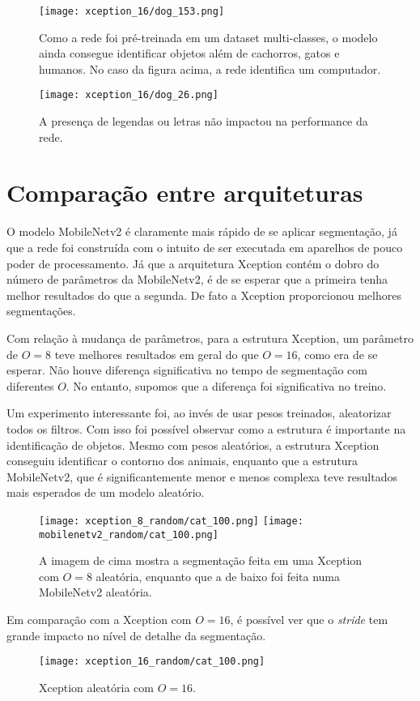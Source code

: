 \documentclass[12pt]{article}
\theoremstyle{plain}
\numberwithin{equation}{section}
\begin{document}
\begin{figure}[H]
  \texttt{[image: xception\_16/dog\_153.png]}
  \caption{Como a rede foi pré-treinada em um dataset multi-classes, o modelo ainda consegue
  identificar objetos além de cachorros, gatos e humanos. No caso da figura acima, a rede
  identifica um computador.}
\end{figure}

\begin{figure}[H]
  \texttt{[image: xception\_16/dog\_26.png]}
  \caption{A presença de legendas ou letras não impactou na performance da rede.}
\end{figure}

\section{Comparação entre arquiteturas}

O modelo MobileNetv2 é claramente mais rápido de se aplicar segmentação, já que a rede foi
construída com o intuito de ser executada em aparelhos de pouco poder de processamento. Já que a
arquitetura Xception contém o dobro do número de parâmetros da MobileNetv2, é de se esperar que a
primeira tenha melhor resultados do que a segunda. De fato a Xception proporcionou melhores
segmentações.

Com relação à mudança de parâmetros, para a estrutura Xception, um parâmetro de $O=8$ teve melhores
resultados em geral do que $O=16$, como era de se esperar. Não houve diferença significativa no
tempo de segmentação com diferentes $O$. No entanto, supomos que a diferença foi significativa no
treino.

Um experimento interessante foi, ao invés de usar pesos treinados, aleatorizar todos os filtros.
Com isso foi possível observar como a estrutura é importante na identificação de objetos. Mesmo
com pesos aleatórios, a estrutura Xception conseguiu identificar o contorno dos animais, enquanto
que a estrutura MobileNetv2, que é significantemente menor e menos complexa teve resultados mais
esperados de um modelo aleatório.

\begin{figure}[H]
  \texttt{[image: xception\_8\_random/cat\_100.png]}
  \texttt{[image: mobilenetv2\_random/cat\_100.png]}
  \caption{A imagem de cima mostra a segmentação feita em uma Xception com $O=8$ aleatória,
  enquanto que a de baixo foi feita numa MobileNetv2 aleatória.}
\end{figure}

Em comparação com a Xception com $O=16$, é possível ver que o \textit{stride} tem grande impacto no
nível de detalhe da segmentação.

\begin{figure}[H]
  \texttt{[image: xception\_16\_random/cat\_100.png]}
  \caption{Xception aleatória com $O=16$.}
\end{figure}

\printbibliography[]
\end{document}
